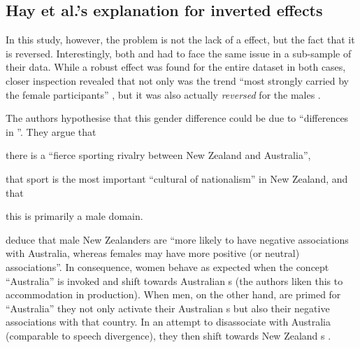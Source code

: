 		\subsection{Hay et al.'s explanation for inverted effects}

In this study, however, the problem is not the lack of a  effect, but the fact that it is reversed.
Interestingly, both \textcite{hayetal2006a} and \textcite{haydrager2010} had to face the same issue in a sub-sample of their data.
While a robust  effect was found for the entire dataset in both cases, closer inspection revealed that not only was the trend ``most strongly carried by the female participants'' \parencite[875]{haydrager2010}, but it was also actually \emph{reversed} for the males \parencite[cf.][876--877]{haydrager2010}.

The authors hypothesise that this gender difference could be due to ``differences in ''.
They argue that
	\begin{inparaenum}[(a)]
		\item there is a ``fierce sporting rivalry between New Zealand and Australia'',
		\item that sport is the most important ``cultural  of nationalism'' in New Zealand, and that
		\item this is primarily a male domain.
	\end{inparaenum}
\citeauthor{haydrager2010} deduce that male New Zealanders are ``more likely to have negative associations with Australia, whereas females may have more positive (or neutral) associations''.
In consequence, women behave as expected when the concept ``Australia'' is invoked and shift towards Australian s (the authors liken this to accommodation in production).
When men, on the other hand, are primed for ``Australia'' they not only activate their Australian s but also their negative associations with that country.
In an attempt to disassociate with Australia (comparable to speech divergence), they then shift towards New Zealand s \parencite[cf.][884--885]{haydrager2010}.

